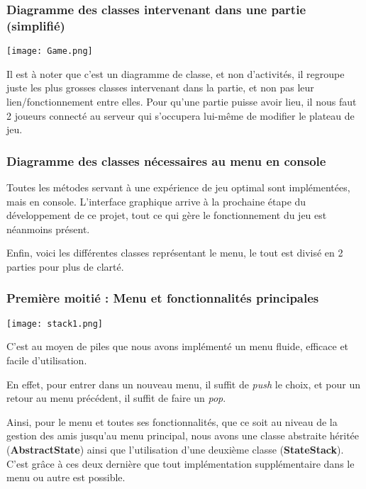 \documentclass[12pt]{article}
\begin{document}
		\newpage
		\subsubsection{Diagramme des classes intervenant dans une partie (simplifié)}
		\begin{center}\texttt{[image: Game.png]}\end{center}
			Il est à noter que c'est un diagramme de classe, et non d'activités, il regroupe juste les plus grosses classes intervenant dans la partie,
			et non pas leur lien/fonctionnement entre elles.
			Pour qu'une partie puisse avoir lieu, il nous faut 2 joueurs connecté au serveur qui s'occupera lui-même de modifier le plateau de jeu.

		\newpage
		\subsubsection{Diagramme des classes nécessaires au menu en console}
			Toutes les métodes servant à une expérience de jeu optimal sont implémentées, mais en console.
			L'interface graphique arrive à la prochaine étape du développement de ce projet, tout ce qui gère le fonctionnement du jeu est néanmoins présent.

			Enfin, voici les différentes classes représentant le menu, le tout est divisé en 2 parties pour plus de clarté.

			\subsubsection{Première moitié : Menu et fonctionnalités principales}
			\begin{center}\texttt{[image: stack1.png]}\end{center}
				C'est au moyen de piles que nous avons implémenté un menu fluide, efficace et facile d'utilisation.

				En effet, pour entrer dans un nouveau menu, il suffit de \textit{\gls{push}} le choix, et pour un retour au menu précédent, il suffit de faire un \textit{\gls{pop}}. 

				Ainsi, pour le menu et toutes ses fonctionnalités, que ce soit au niveau de la gestion des amis jusqu'au menu principal, 
				nous avons une classe abstraite héritée (\textbf{AbstractState}) ainsi que l'utilisation d'une deuxième classe (\textbf{StateStack}). C'est grâce à ces deux dernière que tout 
				implémentation supplémentaire dans le menu ou autre est possible.
\end{document}
